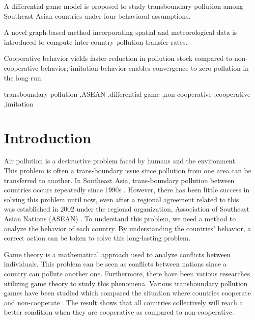 \documentclass[a4paper,fleqn]{cas-dc}
\begin{document}
\begin{highlights}
\item A differential game model is proposed to study transboundary pollution among Southeast Asian countries under four behavioral assumptions.
\item A novel graph-based method incorporating spatial and meteorological data is introduced to compute inter-country pollution transfer rates.
\item Cooperative behavior yields faster reduction in pollution stock compared to non-cooperative behavior; imitation behavior enables convergence to zero pollution in the long run.
\end{highlights}

\begin{keywords}
transboundary pollution \sep ASEAN \sep differential game \sep non-cooperative \sep cooperative \sep imitation
\end{keywords}

\maketitle


\section{Introduction}

Air pollution is a destructive problem faced by humans and the environment. This problem is often a trans-boundary issue since pollution from one area can be transferred to another. In Southeast Asia, trans-boundary pollution between countries occurs repeatedly since 1990s \citep{Mayer2006}. However, there has been little success in solving this problem until now, even after a regional agreement related to this was established in 2002 under the regional organization, Association of Southeast Asian Nations (ASEAN) \citep{Varkkey2014, nazeer2017overview}. To understand this problem, we need a method to analyze the behavior of each country. By understanding the countries' behavior, a correct action can be taken to solve this long-lasting problem.

Game theory is a mathematical approach used to analyze conflicts between individuals. This problem can be seen as conflicts between nations since a country can pollute another one. Furthermore, there have been various researches utilizing game theory to study this phenomena. Various transboundary pollution games have been studied which compared the situation where countries cooperate and non-cooperate \citep{missfeldt1999game}. The result shows that all countries collectively will reach a better condition when they are cooperative as compared to non-cooperative.
\end{document}
